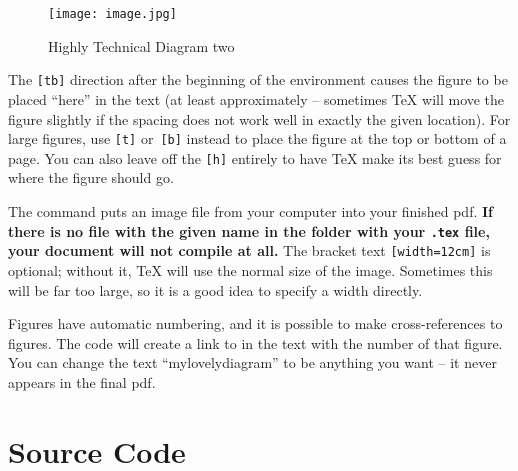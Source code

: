\begin{figure}[tb]
	\center\texttt{[image: image.jpg]}
	\caption{Highly Technical Diagram two}
	\label{fig:mylovelydiagramtwo}
\end{figure}

The \texttt{[tb]} direction after the beginning of the environment causes the 
figure to be placed ``here'' in the text (at least approximately -- sometimes 
\TeX{} will move the figure slightly if the spacing does not work well in 
exactly the given location). For large figures, use \texttt{[t]} 
or~\texttt{[b]} instead to place the figure at the top or bottom of a page. You 
can also leave off the \texttt{[h]} entirely to have \TeX{} make its best guess 
for where the figure should go.

The  command puts an image file from your computer into 
your finished pdf. \textbf{If there is no file with the given name in the 
folder with your \texttt{.tex} file, your document will not compile at all.} 
The bracket text \texttt{[width=12cm]} is optional; without it, \TeX{} will use 
the normal size of the image. Sometimes this will be far too large, so it is a 
good idea to specify a width directly.

Figures have automatic numbering, and it is possible to make cross-references 
to figures. The code  will create a link to 
 in the text with the number of that figure. You can 
change the text ``mylovelydiagram'' to be anything you want -- it never appears 
in the final pdf.

\section{Source Code}

